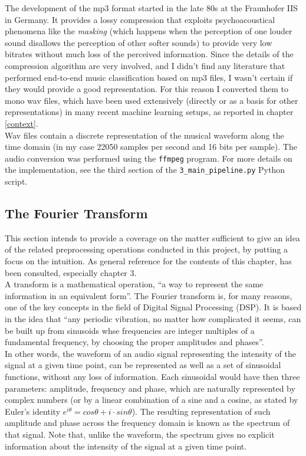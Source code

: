 The development of the mp3 format started in the late 80s at the Fraunhofer IIS in Germany\cite{mp3}. It provides a lossy compression that exploits psychoacoustical phenomena like the {\it masking} (which happens when the perception of one louder sound disallows the perception of other softer sounds) to provide very low bitrates without much loss of the perceived information. Since the details of the compression algorithm are very involved, and I didn't find any literature that performed end-to-end music classification based on mp3 files, I wasn't certain if they would provide a good representation. For this reason I converted them to mono wav files, which have been used extensively (directly or as a basis for other representations) in many recent machine learning setups, as reported in chapter \ref{context}.\\

Wav files contain a discrete representation of the musical waveform along the time domain (in my case 22050 samples per second and 16 bits per sample). The audio conversion was performed using the \texttt{ffmpeg} program. For more details on the implementation, see the third section of the \texttt{3\_main\_pipeline.py} Python script.

\subsection{The Fourier Transform}

This section intends to provide a coverage on the matter sufficient to give an idea of the related preprocessing operations conducted in this project, by putting a focus on the intuition. As general reference for the contents of this chapter, \cite{musimathics} has been consulted, especially chapter 3.\\

A transform is a mathematical operation, ``a way to represent the same information in an equivalent form''. The Fourier transform is, for many reasons, one of the key concepts in the field of Digital Signal Processing (DSP). It is based in the idea that ``any periodic vibration, no matter how complicated it seems, can be built up from sinusoids whse frequencies are integer multiples of a fundamental frequency, by choosing the proper amplitudes and phases''.\\

In other words, the waveform of an audio signal representing the intensity of the signal at a given time point, can be represented as well as a set of sinusoidal functions, without any loss of information. Each sinusoidal would have then three parameters: amplitude, frequency and phase, which are naturally represented by complex numbers (or by a linear combination of a sine and a cosine, as stated by Euler's identity \(e^{i\theta}=cos\theta+i\cdot sin\theta\)). The resulting representation of such amplitude and phase across the frequency domain is known as the spectrum of that signal. Note that, unlike the waveform, the spectrum gives no explicit information about the intensity of the signal at a given time point.


